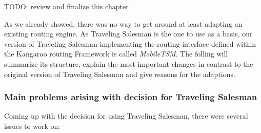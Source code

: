 TODO: review and finalize this chapter\newline

As we already showed, there was no way to get around at least adapting an existing routing engine. As Traveling Salesman is the one to use as a basis, our version of Traveling Salesman implementing the routing interface defined within the Kangaroo routing Framework is called \emph{MobileTSM}. The folling will summarize its structure, explain the most important changes in contrast to the original version of Traveling Salesman and give reasons for the adaptions.

\subsubsection{Main problems arising with decision for Traveling Salesman}

Coming up with the decision for using Traveling Salesman, there were several issues to work on:

